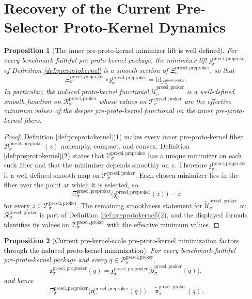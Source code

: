 \documentclass[11pt]{article}
\newcommand{\PreKernelBody}[1]{\mathcal P_{#1}^{\mathrm{presel,preker}}}
\newcommand{\ProtoKernelSpace}[1]{\mathcal R_{#1}^{\mathrm{presel,proker}}}
\newcommand{\ProtoKernelBody}[1]{\mathcal T_{#1}^{\mathrm{presel,proker}}}
\newcommand{\PreProtoKernelProj}[1]{\Xi_{#1}^{\mathrm{presel,preproker}}}
\newcommand{\PreProtoKernelFiber}[2]{\mathcal B_{#1}^{\mathrm{presel,preproker}}(#2)}
\newcommand{\PreProtoKernelFunctional}[1]{\mathscr V_{#1}^{\mathrm{presel,preproker}}}
\newcommand{\PreProtoKernelMinLift}[1]{\mathfrak z_{#1}^{\mathrm{presel,preproker}}}
\newcommand{\PreProtoKernelPreKernelMin}[1]{\mathfrak a_{#1}^{\mathrm{presel,preproker}}}
\newcommand{\InducedProtoKernelFunctional}[1]{\widetilde{\mathscr U}_{#1}^{\mathrm{presel,proker}}}
\newcommand{\InducedProtoKernelMinLift}[1]{\widetilde{\mathfrak v}_{#1}^{\mathrm{presel,proker}}}
\newtheorem{proposition}{Proposition}
\begin{document}
\section{Recovery of the Current Pre-Selector Proto-Kernel Dynamics}

\begin{proposition}[The inner pre-proto-kernel minimizer lift is well defined]
\label{prop:inner}
For every benchmark-faithful pre-proto-kernel package, the minimizer lift \(\PreProtoKernelMinLift{\sigma}\) of Definition \ref{def:preprotokernel} is a smooth section of \(\PreProtoKernelProj{\sigma}\), so that
\[
\PreProtoKernelProj{\sigma}\circ\PreProtoKernelMinLift{\sigma}
=
\mathrm{id}_{\ProtoKernelBody{\sigma}}.
\]
In particular, the induced proto-kernel functional \(\InducedProtoKernelFunctional{\sigma}\) is a well-defined smooth function on \(\ProtoKernelSpace{\sigma}\) whose values on \(\ProtoKernelBody{\sigma}\) are the effective minimum values of the deeper pre-proto-kernel functional on the inner pre-proto-kernel fibers.
\end{proposition}

\begin{proof}
Definition \ref{def:preprotokernel}(1) makes every inner pre-proto-kernel fiber \(\PreProtoKernelFiber{\sigma}{z}\) nonempty, compact, and convex. Definition \ref{def:preprotokernel}(2) states that \(\PreProtoKernelFunctional{\sigma}\) has a unique minimizer on each such fiber and that the minimizer depends smoothly on \(z\). Therefore \(\PreProtoKernelMinLift{\sigma}\) is a well-defined smooth map on \(\ProtoKernelBody{\sigma}\). Each chosen minimizer lies in the fiber over the point at which it is selected, so
\[
\PreProtoKernelProj{\sigma}\bigl(\PreProtoKernelMinLift{\sigma}(z)\bigr)=z
\]
for every \(z\in\ProtoKernelBody{\sigma}\). The remaining smoothness statement for \(\InducedProtoKernelFunctional{\sigma}\) on \(\ProtoKernelSpace{\sigma}\) is part of Definition \ref{def:preprotokernel}(2), and the displayed formula identifies its values on \(\ProtoKernelBody{\sigma}\) with the effective minimum values.
\end{proof}

\begin{proposition}[Current pre-kernel-scale pre-proto-kernel minimization factors through the induced proto-kernel minimization]
\label{prop:prekerfactor}
For every benchmark-faithful pre-proto-kernel package and every \(q\in\PreKernelBody{\sigma}\),
\[
\PreProtoKernelPreKernelMin{\sigma}(q)
=
\PreProtoKernelMinLift{\sigma}\bigl(\InducedProtoKernelMinLift{\sigma}(q)\bigr),
\]
and hence
\[
\PreProtoKernelProj{\sigma}\bigl(\PreProtoKernelPreKernelMin{\sigma}(q)\bigr)
=
\InducedProtoKernelMinLift{\sigma}(q).
\]
\end{proposition}
\end{document}
